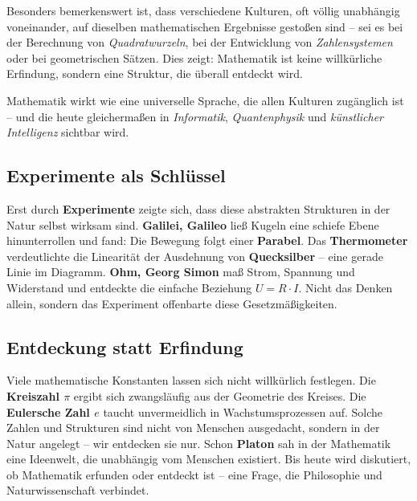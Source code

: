 Besonders bemerkenswert ist, dass verschiedene Kulturen, oft völlig unabhängig voneinander, 
auf dieselben mathematischen Ergebnisse gestoßen sind – sei es bei der 
Berechnung von \emph{Quadratwurzeln}, 
bei der Entwicklung von \emph{Zahlensystemen} 
oder bei geometrischen Sätzen. 
Dies zeigt: Mathematik ist keine willkürliche Erfindung, sondern eine Struktur, 
die überall entdeckt wird.

Mathematik wirkt wie eine universelle Sprache, 
die allen Kulturen zugänglich ist – und die heute gleichermaßen in 
\emph{Informatik}, \emph{Quantenphysik} 
und \emph{künstlicher Intelligenz} sichtbar wird.
\vspace{1em}





\subsection{Experimente als Schlüssel}

Erst durch \textbf{Experimente} zeigte sich, dass diese abstrakten Strukturen in der Natur selbst wirksam sind.
\textbf{Galilei, Galileo} ließ Kugeln eine schiefe Ebene hinunterrollen und fand: Die Bewegung folgt einer \textbf{Parabel}. 
Das \textbf{Thermometer} verdeutlichte die Linearität der Ausdehnung von \textbf{Quecksilber} – eine gerade Linie im Diagramm. 
\textbf{Ohm, Georg Simon} maß Strom, Spannung und Widerstand und entdeckte die einfache Beziehung \( U = R \cdot I \). 
Nicht das Denken allein, sondern das Experiment offenbarte diese Gesetzmäßigkeiten.

\subsection{Entdeckung statt Erfindung}

Viele mathematische Konstanten lassen sich nicht willkürlich festlegen. 
Die \textbf{Kreiszahl $\pi$} ergibt sich zwangsläufig aus der Geometrie des Kreises. 
Die \textbf{Eulersche Zahl $e$} taucht unvermeidlich in Wachstumsprozessen auf. 
Solche Zahlen und Strukturen sind nicht von Menschen ausgedacht, sondern in der Natur angelegt – wir entdecken sie nur. 
Schon \textbf{Platon} sah in der Mathematik eine Ideenwelt, die unabhängig vom Menschen existiert. 
Bis heute wird diskutiert, ob Mathematik erfunden oder entdeckt ist – eine Frage, die Philosophie und Naturwissenschaft verbindet.  
